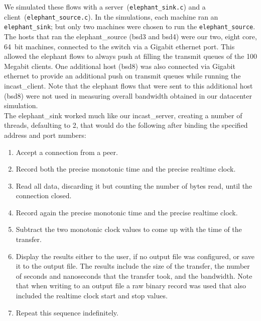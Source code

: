 \documentclass[12pt]{article}
\begin{document}
We simulated these flows
with a server~(\texttt{elephant\_sink.c}) and a client~(\texttt{elephant\_source.c}). In the simulations, each machine ran
an \texttt{elephant\_sink}; but only two machines were chosen to run the \texttt{elephant\_source}. The hosts
that ran the elephant\_source (bsd3 and bsd4) were our two, eight core, 64~bit machines, connected to the switch
via a Gigabit ethernet port. This allowed the elephant flows to always push at filling the transmit queues
of the 100 Megabit clients. One additional host (bsd8) was also connected via Gigabit ethernet to provide
an additional push on transmit queues while running the incast\_client. Note that the elephant flows that
were sent to this additional host (bsd8) were not used in measuring overall bandwidth obtained 
in our datacenter simulation.
\\

The elephant\_sink worked much like our incast\_server, creating a
number of threads, defaulting to 2, that
would do the following after binding the specified address and port numbers:
\begin{enumerate}

\item Accept a connection from a peer.

\item Record both the precise monotonic time and the precise realtime clock.

\item Read all data, discarding it but counting the number of bytes read, until the connection closed.

\item Record again the precise monotonic time and the precise realtime clock.

\item Subtract the two monotonic clock values to come up with the time of the transfer.

\item Display the results either to the user, if no output file was configured, or save
it to the output file. The results include the size of the transfer, the number of seconds and nanoseconds
that the transfer took, and the bandwidth. Note that when writing to an output file a raw binary record
was used that also included the realtime clock start and stop values.

\item Repeat this sequence indefinitely.

\end{enumerate}
\end{document}
